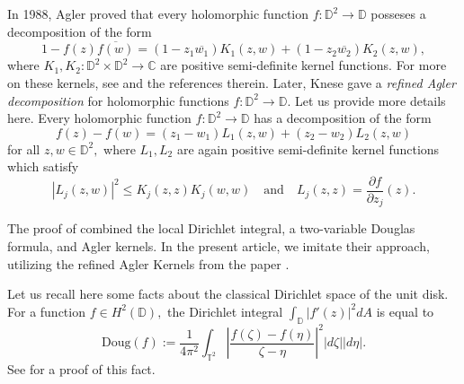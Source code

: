 \documentclass[11pt]{amsart}
\numberwithin{equation}{section}
\begin{document}
In 1988, Agler proved that every holomorphic function $f\colon\mathbb{D}^2\to\mathbb{D}$ posseses a decomposition of the form
$$1-f(z)\overline{f(w)}=(1-z_1\overline{w_1})K_1(z,w)+(1-z_2\overline{w_2})K_2(z,w),$$
where $K_1,K_2\colon\mathbb{D}^2\times\mathbb{D}^2\to \mathbb{C}$ are positive semi-definite kernel functions. For more on these kernels, see  \cite{AMY} and the references therein. Later, Knese \cite{KneseIndiana} gave a \textit{refined Agler decomposition} for holomorphic functions $f\colon\mathbb{D}^2\to\mathbb{D}.$ 
Let us provide more details here. Every holomorphic function $f\colon\mathbb{D}^2\to\mathbb{D}$ has a decomposition of the form
$$f(z)-f(w)=(z_1-w_1)L_{1}(z,w)+(z_2-w_2)L_2(z,w)$$ for all $z,w\in\mathbb{D}^2,$ 
where $L_1,L_2$ are again positive semi-definite kernel functions which satisfy \[|L_j(z,w)|^2\leq K_j(z,z)K_j(w,w)\quad  \textrm{and}\quad  L_j(z,z)=\frac{\partial f}{\partial z_j}(z).\] 

The proof of \cite[Theorem 10.2]{PLMS} combined the local Dirichlet integral, a two-variable Douglas formula, and Agler kernels. In the present article, we imitate their approach, utilizing the refined Agler Kernels from the paper \cite{KneseIndiana}.

Let us recall here some facts about the classical Dirichlet space of the unit disk. For a function $f\in H^2(\mathbb{D}),$ the Dirichlet integral $\int_{\mathbb{D}}|f'(z)|^2dA$ is equal to
$$\mathrm{Doug}(f):=\frac{1}{4\pi^2}\int_{\mathbb{T}^2}\left|\frac{f(\zeta)-f(\eta)}{\zeta-\eta}\right|^2|d\zeta||d\eta|.$$
See \cite[Chapter 1]{Ransford} for a proof of this fact.
\end{document}
